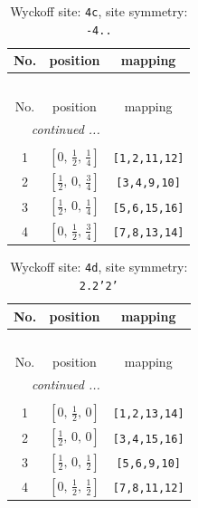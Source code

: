 \documentclass[fleqn,8pt]{jsarticle}
\begin{document}
\renewcommand{\arraystretch}{1.2}
\begin{longtable}{ccc}
\caption{Wyckoff site: {\tt 4c}, site symmetry: {\tt -4..}}
 \\
 \hline \hline
No. & position & mapping \\ \hline \endfirsthead

\multicolumn{2}{l}{\tablename\ \thetable{}} \\
 \hline \hline
No. & position & mapping \\ \hline \endhead

 \hline \hline
\multicolumn{2}{r}{\footnotesize\it continued ...} \\ \endfoot

 \hline \hline
\multicolumn{2}{r}{} \\ \endlastfoot

1 & $\left[ 0,\, \frac{1}{2},\, \frac{1}{4} \right]$ & {\tt [1,2,11,12]} \\ \hline
2 & $\left[ \frac{1}{2},\, 0,\, \frac{3}{4} \right]$ & {\tt [3,4,9,10]} \\ \hline
3 & $\left[ \frac{1}{2},\, 0,\, \frac{1}{4} \right]$ & {\tt [5,6,15,16]} \\ \hline
4 & $\left[ 0,\, \frac{1}{2},\, \frac{3}{4} \right]$ & {\tt [7,8,13,14]} \\
\end{longtable}
\renewcommand{\arraystretch}{1.2}
\begin{longtable}{ccc}
\caption{Wyckoff site: {\tt 4d}, site symmetry: {\tt 2.2'2'}}
 \\
 \hline \hline
No. & position & mapping \\ \hline \endfirsthead

\multicolumn{2}{l}{\tablename\ \thetable{}} \\
 \hline \hline
No. & position & mapping \\ \hline \endhead

 \hline \hline
\multicolumn{2}{r}{\footnotesize\it continued ...} \\ \endfoot

 \hline \hline
\multicolumn{2}{r}{} \\ \endlastfoot

1 & $\left[ 0,\, \frac{1}{2},\, 0 \right]$ & {\tt [1,2,13,14]} \\ \hline
2 & $\left[ \frac{1}{2},\, 0,\, 0 \right]$ & {\tt [3,4,15,16]} \\ \hline
3 & $\left[ \frac{1}{2},\, 0,\, \frac{1}{2} \right]$ & {\tt [5,6,9,10]} \\ \hline
4 & $\left[ 0,\, \frac{1}{2},\, \frac{1}{2} \right]$ & {\tt [7,8,11,12]} \\
\end{longtable}
\end{document}
